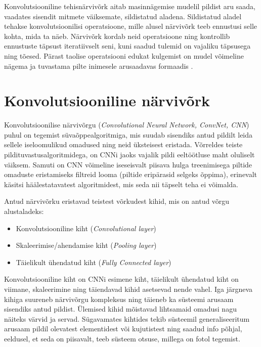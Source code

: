 Konvolutsiooniline tehisnärvivõrk aitab masinnägemise mudelil pildist aru saada, vaadates sisendit mitmete väiksemate, sildistatud aladena. Sildistatud aladel tehakse konvolutsioonilisi operatsioone, mille alusel närvivõrk teeb ennustusi selle kohta, mida ta näeb. Närvivõrk kordab neid operatsioone ning kontrollib ennustuste täpsust iteratiivselt seni, kuni saadud tulemid on vajaliku täpsusega ning tõesed. Pärast taolise operatsiooni edukat kulgemist on mudel võimeline nägema ja tuvastama pilte inimesele arusaadavas formaadis \cite{ref14}.

\section{Konvolutsiooniline närvivõrk}\label{konvolutsiooniline-nuxe4rvivuxf5rk}

Konvolutsioonilise närvivõrgu (\emph{Convolutional Neural Network, ConvNet, CNN}) puhul on tegemist süvaõppealgoritmiga, mis suudab sisendiks antud pildilt leida sellele iseloomulikud omadused ning neid üksteisest eristada. Võrreldes teiste pildituvastusalgoritmidega, on CNNi jaoks vajalik pildi eeltöötluse maht oluliselt väiksem. Samuti on CNN võimeline iseseisvalt piisava hulga treenimisega piltide omaduste eristamiseks filtreid looma (piltide eripärasid selgeks õppima), erinevalt käsitsi häälestatavatest algoritmidest, mis seda nii täpselt teha ei võimalda. \cite{ref15}

Antud närvivõrku eristavad teistest võrkudest kihid, mis on antud võrgu alustaladeks:

\begin{itemize}
\item
  Konvolutsiooniline kiht (\emph{Convolutional layer})
\item
  Skaleerimise/ahendamise kiht (\emph{Pooling layer})
\item
  Täielikult ühendatud kiht (\emph{Fully Connected layer})
\end{itemize}

Konvolutsiooniline kiht on CNNi esimene kiht, täielikult ühendatud kiht on viimane, skaleerimine ning täiendavad kihid asetsevad nende vahel. Iga järgneva kihiga suureneb närvivõrgu kompleksus ning täieneb ka süsteemi arusaam sisendiks antud pildist. Ülemised kihid mõistavad lihtsamaid omadusi nagu näiteks värvid ja servad. Sügavamates kihtides tekib süsteemil generaliseeritum arusaam pildil olevatest elementidest või kujutistest ning saadud info põhjal, eeldusel, et seda on piisavalt, teeb süsteem otsuse, millega on fotol tegemist.

